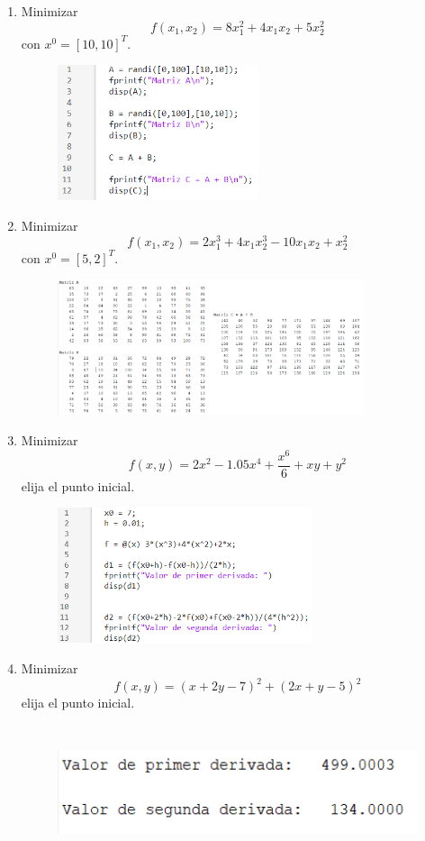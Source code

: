 \documentclass[12pt]{article}
\begin{document}
\begin{enumerate}
    \item Minimizar \[f(x_1,x_2) = 8x_1^2 + 4x_1x_2 + 5x_2^2\] con $x^0 = [10,10]^T$.
    \begin{figure}[H]
        \centering
        \includegraphics[height = 150px]{figura1.png}
    \end{figure}
    \item Minimizar \[f(x_1,x_2) = 2x_1^3+4x_1x_2^3-10x_1x_2+x_2^2\] con $x^0 = [5,2]^T$.
    \begin{figure}[H]
      \centering
      \includegraphics[height = 150px]{figura2.png}
  \end{figure}
  \newpage
    \item Minimizar \[f(x,y) = 2x^2-1.05x^4 + \frac{x^6}{6} + xy + y^2\] elija el punto inicial.
    \begin{figure}[H]
      \centering
      \includegraphics[height = 150px]{figura3.png}
  \end{figure}

  \vfill{}

    \item Minimizar \[f(x,y) = (x+2y-7)^2+(2x+y-5)^2\] elija el punto inicial.
    \begin{figure}[H]
      \centering
      \includegraphics[height = 150px]{figura4.png}
  \end{figure}
\end{enumerate}
\end{document}
